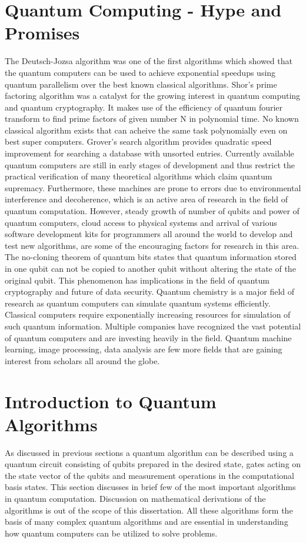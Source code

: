 \documentclass[english,a4paper,11pt,oneside,onecolumn]{book}
\begin{document}
\section{Quantum Computing - Hype and Promises}
\label{sec:qHype}
The Deutsch-Jozsa algorithm was one of the first algorithms which showed that the quantum computers can be used to achieve exponential speedups using quantum parallelism over the best known classical algorithms. Shor's prime factoring algorithm was a catalyst for the growing interest in quantum computing and quantum cryptography. It makes use of the efficiency of quantum fourier transform to find prime factors of given number N in polynomial time. No known classical algorithm exists that can acheive the same task polynomially even on best super computers. Grover's search algorithm provides quadratic speed improvement for searching a database with unsorted entries.
Currently available quantum computers are still in early stages of development and thus restrict the practical verification of many theoretical algorithms which claim quantum supremacy. Furthermore, these machines are prone to errors due to environmental interference and decoherence, which is an active area of research in the field of quantum computation. However, steady growth of number of qubits and power of quantum computers, cloud access to physical systems and arrival of various software development kits for programmers all around the world to develop and test new algorithms, are some of the encouraging factors for research in this area.
The no-cloning theorem of quantum bits states that quantum information stored in one qubit can not be copied to another qubit without altering the state of the original qubit. This phenomenon has implications in the field of quantum cryptography and future of data security. Quantum chemistry is a major field of research as quantum computers can simulate quantum systems efficiently. Classical computers require exponentially increasing resources for simulation of such quantum information. Multiple companies have recognized the vast potential of quantum computers and are investing heavily in the field. Quantum machine learning, image processing, data analysis are few more fields that are gaining interest from scholars all around the globe.

\section{Introduction to Quantum Algorithms}
\label{sec:qAlgo}
As discussed in previous sections a quantum algorithm can be described using a quantum circuit consisting of qubits prepared in the desired state, gates acting on the state vector of the qubits and measurement operations in the computational basis states. This section discusses in brief few of the most important algorithms in quantum computation. Discussion on mathematical derivations of the algorithms is out of the scope of this dissertation. All these algorithms form the basis of many complex quantum algorithms and are essential in understanding how quantum computers can be utilized to solve problems.
\end{document}
